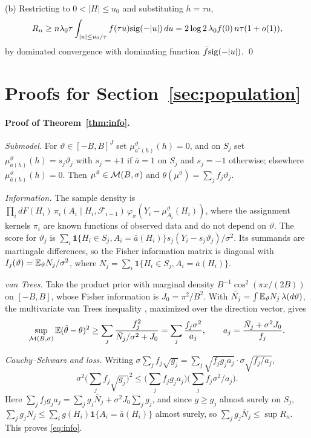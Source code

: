 (b) Restricting to $0<|H|\le u_0$ and substituting $h=\tau u$,
\[
R_n\ge n\lambda_0\tau\int_{|u|\le u_0/\tau}f(\tau u)\mathrm{sig}(-|u|)\,du
=2\log2\,\lambda_0f(0)\,n\tau(1+o(1)),
\]
by dominated convergence with dominating function $\bar f\mathrm{sig}(-|u|)$. \qed

\section{Proofs for Section~\ref{sec:population}}\label{app:population}

\paragraph{Proof of Theorem~\ref{thm:info}.}
\emph{Submodel.} For $\vartheta\in[-B,B]^J$ set $\mu^\vartheta_{a^*(h)}(h)=0$,
and on $S_j$ set $\mu^\vartheta_{\bar a(h)}(h)=s_j\vartheta_j$ with $s_j=+1$ if
$\bar a=1$ on $S_j$ and $s_j=-1$ otherwise; elsewhere
$\mu^\vartheta_{\bar a(h)}(h)=0$. Then $\mu^\vartheta\in\mathcal{M}(B,\sigma)$ and
$\theta(\mu^\vartheta)=\sum_jf_j\vartheta_j$.

\emph{Information.} The sample density is
$\prod_idF(H_i)\,\pi_i(A_i\mid H_i,\mathcal F_{i-1})\,\varphi_\sigma(Y_i-\mu^\vartheta_{A_i}(H_i))$,
where the assignment kernels $\pi_i$ are known functions of observed data and do
not depend on $\vartheta$. The score for $\vartheta_j$ is
$\sum_i\mathbf 1\{H_i\in S_j,A_i=\bar a(H_i)\}s_j(Y_i-s_j\vartheta_j)/\sigma^2$.
Its summands are martingale differences, so the Fisher information matrix is
diagonal with $I_j(\vartheta)=\mathbb{E}_\vartheta N_j/\sigma^2$, where
$N_j=\sum_i\mathbf 1\{H_i\in S_j,A_i=\bar a(H_i)\}$.

\emph{van Trees.} Take the product prior with marginal density
$B^{-1}\cos^2(\pi x/(2B))$ on $[-B,B]$, whose Fisher information is $J_0=\pi^2/B^2$.
With $\bar N_j=\int\mathbb{E}_\vartheta N_j\,\lambda(d\vartheta)$, the multivariate van
Trees inequality \cite{gill1995applications}, maximized over the direction
vector, gives
\[
\sup_{\mathcal{M}(B,\sigma)}\mathbb{E}(\hat\theta-\theta)^2\ge\sum_j\frac{f_j^2}{\bar N_j/\sigma^2+J_0}=\sum_j\frac{f_j\sigma^2}{a_j},
\qquad a_j=\frac{\bar N_j+\sigma^2J_0}{f_j}.
\]

\emph{Cauchy--Schwarz and loss.} Writing
$\sigma\sum_jf_j\sqrt{g_j}=\sum_j\sqrt{f_jg_ja_j}\cdot\sigma\sqrt{f_j/a_j}$,
\[
\sigma^2\Big(\sum_jf_j\sqrt{g_j}\Big)^2\le\Big(\sum_jf_jg_ja_j\Big)\Big(\sum_jf_j\sigma^2/a_j\Big).
\]
Here $\sum_jf_jg_ja_j=\sum_jg_j\bar N_j+\sigma^2J_0\sum_jg_j$, and since $g\ge g_j$
almost surely on $S_j$, $\sum_jg_jN_j\le\sum_ig(H_i)\mathbf 1\{A_i=\bar a(H_i)\}$
almost surely, so $\sum_jg_j\bar N_j\le\sup R_n$. This proves \eqref{eq:info}.

